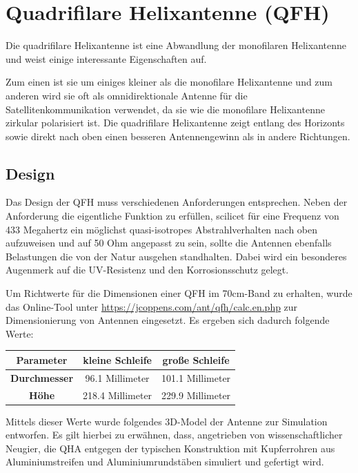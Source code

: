 \chapter{Quadrifilare Helixantenne (QFH)}
\label{chap:qfh}
Die quadrifilare Helixantenne ist eine Abwandlung der monofilaren Helixantenne und weist einige interessante Eigenschaften auf.

Zum einen ist sie um einiges kleiner als die monofilare Helixantenne und zum anderen wird sie oft als omnidirektionale Antenne für die Satellitenkommunikation verwendet, da sie wie die monofilare Helixantenne zirkular polarisiert ist. Die quadrifilare Helixantenne zeigt entlang des Horizonts sowie direkt nach oben einen besseren Antennengewinn als in andere Richtungen.

\section{Design}
Das Design der QFH muss verschiedenen Anforderungen entsprechen. Neben der Anforderung die eigentliche Funktion zu erfüllen, scilicet für eine Frequenz von 433 Megahertz ein möglichst quasi-isotropes Abstrahlverhalten nach oben aufzuweisen und auf 50 Ohm angepasst zu sein, sollte die Antennen ebenfalls Belastungen die von der Natur ausgehen standhalten. Dabei wird ein besonderes Augenmerk auf die UV-Resistenz und den Korrosionsschutz gelegt. 

Um Richtwerte für die Dimensionen einer QFH im 70cm-Band zu erhalten, wurde das Online-Tool unter \url{https://jcoppens.com/ant/qfh/calc.en.php} zur Dimensionierung von Antennen eingesetzt. Es ergeben sich dadurch folgende Werte:

\begin{center}
	\begin{tabular}{|c|c|c|}
		\hline
		\textbf{Parameter} & \textbf{kleine Schleife} & \textbf{große Schleife} \\
		\hline
		\textbf{Durchmesser} & 96.1 Millimeter & 101.1 Millimeter \\
		\hline
		\textbf{Höhe} & 218.4 Millimeter & 229.9 Millimeter \\
		\hline
	\end{tabular}
\end{center}

Mittels dieser Werte wurde folgendes 3D-Model der Antenne zur Simulation entworfen. Es gilt hierbei zu erwähnen, dass, angetrieben von wissenschaftlicher Neugier, die QHA entgegen der typischen Konstruktion mit Kupferrohren aus Aluminiumstreifen und Aluminiumrundstäben simuliert und gefertigt wird. 

